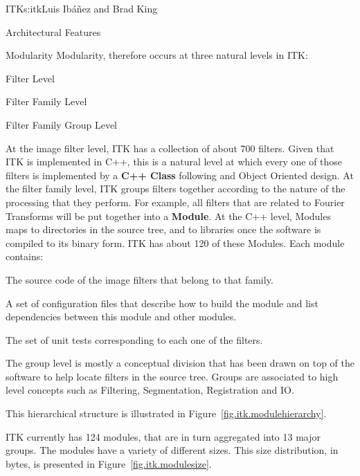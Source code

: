 \begin{aosachapter}{ITK}{s:itk}{Luis Ib\'{a}\~{n}ez and Brad King}
\begin{aosasect1}{Architectural Features}
\begin{aosasect2}{Modularity}
Modularity, therefore occurs at three natural levels in ITK:

\begin{aosaitemize}
\item Filter Level
\item Filter Family Level
\item Filter Family Group Level
\end{aosaitemize}

At the image filter level, ITK has a collection of about 700 filters. Given
that ITK is implemented in C++, this is a natural level at which every one of
those filters is implemented by a \textbf{C++ Class} following and Object
Oriented design.  At the filter family level, ITK groups filters together
according to the nature of the processing that they perform. For example, all
filters that are related to Fourier Transforms will be put together into a
\textbf{Module}.  At the C++ level, Modules maps to directories in the
source tree, and to libraries once the software is compiled to its
binary form. ITK has about 120 of these Modules. Each module contains:

\begin{aosaenumerate}

\item The source code of the image filters that belong to that family.

\item A set of configuration files that describe how to build the module and
list dependencies between this module and other modules.

\item The set of unit tests corresponding to each one of the filters.

\end{aosaenumerate}

The group level is mostly a conceptual division that has been drawn on
top of the software to help locate filters in the source tree. Groups
are associated to high level concepts such as Filtering, Segmentation,
Registration and IO.

This hierarchical structure is illustrated in
Figure~\ref{fig.itk.modulehierarchy}.



ITK currently has 124 modules, that are in turn aggregated into 13 major groups.
The modules have a variety of different sizes. This size distribution, in
bytes, is presented in Figure~\ref{fig.itk.modulesize}.


\end{aosasect2}
\end{aosasect1}
\end{aosachapter}
